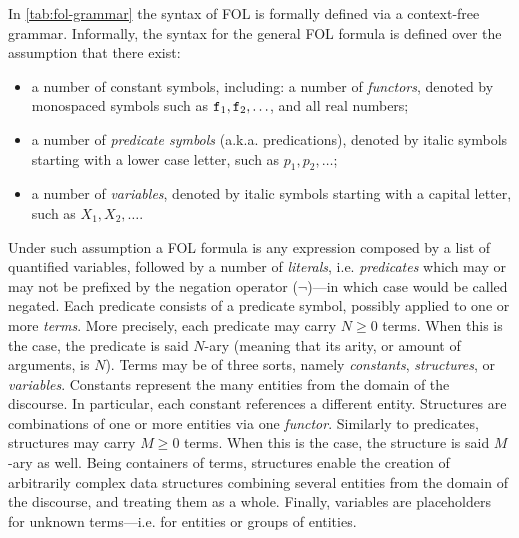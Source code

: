 \documentclass[12pt,a4paper,openright,twoside]{book}
\begin{document}
In \cref{tab:fol-grammar} the syntax of FOL is formally defined via a context-free grammar.
%
Informally, the syntax for the general FOL formula is defined over the assumption that there exist:
%
\begin{itemize}
    \item a number of constant symbols, including: a number of \emph{functors}, denoted by monospaced symbols such as $\mathtt{f}_1, \mathtt{f}_2, \ldots$, and all real numbers;

    \item a number of \emph{predicate symbols} (a.k.a. predications), denoted by italic symbols starting with a lower case letter, such as $p_1, p_2, \ldots$;

    \item a number of \emph{variables}, denoted by italic symbols starting with a capital letter, such as $X_1, X_2, \ldots$.
\end{itemize}
%
Under such assumption a FOL formula is any expression composed by a list of quantified variables, followed by a number of \emph{literals}, i.e. \emph{predicates} which may or may not be prefixed by the negation operator ($\lnot$)---in which case would be called negated.
%
Each predicate consists of a predicate symbol, possibly applied to one or more \emph{terms}.
%
More precisely, each predicate may carry $N \geq 0$ terms.
%
When this is the case, the predicate is said $N$-ary (meaning that its arity, or amount of arguments, is $N$).
%
Terms may be of three sorts, namely \emph{constants}, \emph{structures}\footnotemark, or \emph{variables}.
%
%
Constants represent the many entities from the domain of the discourse.
%
In particular, each constant references a different entity.
%
Structures are combinations of one or more entities via one \emph{functor}\footnotemark.
%
%
Similarly to predicates, structures may carry $M \geq 0$ terms.
%
When this is the case, the structure is said $M$-ary as well.
%
Being containers of terms, structures enable the creation of arbitrarily complex data structures combining several entities from the domain of the discourse, and treating them as a whole.
%
Finally, variables are placeholders for unknown terms---i.e. for entities or groups of entities.
\end{document}
